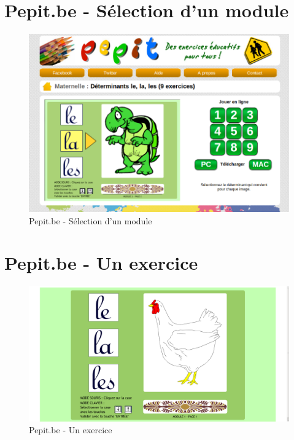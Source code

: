 \section*{Pepit.be - Sélection d'un module}
\begin{figure}[H]
\begin{center}
\includegraphics[width=15cm]{images/pepit_be_modules}
\end{center}
\caption{Pepit.be - Sélection d'un module}
\label{Pepit.be - Sélection d'un module}
\end{figure}

\section*{Pepit.be - Un exercice}
\begin{figure}[H]
\begin{center}
\includegraphics[width=15cm]{images/pepit_be_practice}
\end{center}
\caption{Pepit.be - Un exercice}
\label{Pepit.be - Un exercice}
\end{figure}

